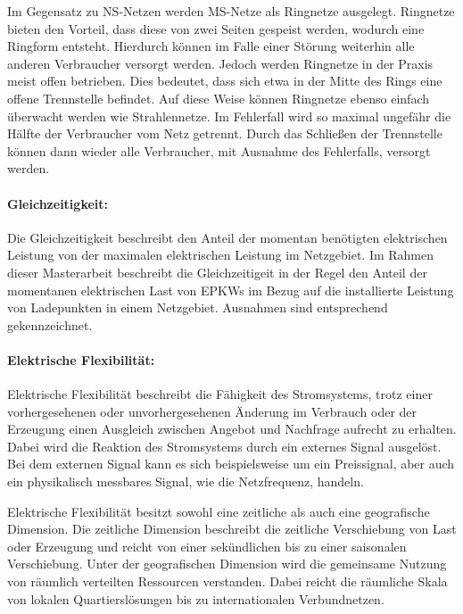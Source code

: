 Im Gegensatz zu \gls{NS}-Netzen werden \gls{MS}-Netze als Ringnetze ausgelegt.
Ringnetze bieten den Vorteil, dass diese von zwei Seiten gespeist werden, wodurch eine Ringform entsteht.
Hierdurch können im Falle einer Störung weiterhin alle anderen Verbraucher versorgt werden.
Jedoch werden Ringnetze in der Praxis meist offen betrieben.
Dies bedeutet, dass sich etwa in der Mitte des Rings eine offene Trennstelle befindet.
Auf diese Weise können Ringnetze ebenso einfach überwacht werden wie Strahlennetze.
Im Fehlerfall wird so maximal ungefähr die Hälfte der Verbraucher vom Netz getrennt.
Durch das Schließen der Trennstelle können dann wieder alle Verbraucher, mit Ausnahme des Fehlerfalls, versorgt werden. \cite{WNG2020} \cite{Westermann2019}


\paragraph{Gleichzeitigkeit:}

Die Gleichzeitigkeit beschreibt den Anteil der momentan benötigten elektrischen Leistung von der maximalen elektrischen Leistung im Netzgebiet. \cite{Agora2019} 
Im Rahmen dieser Masterarbeit beschreibt die Gleichzeitigeit in der Regel den Anteil der momentanen elektrischen Last von \glspl{EPKW} im Bezug auf die installierte Leistung von Ladepunkten in einem Netzgebiet.
Ausnahmen sind entsprechend gekennzeichnet.


\paragraph{Elektrische Flexibilität:}

Elektrische Flexibilität beschreibt die Fähigkeit des Stromsystems, trotz einer vorhergesehenen oder unvorhergesehenen Änderung im Verbrauch oder der Erzeugung einen Ausgleich zwischen Angebot und Nachfrage aufrecht zu erhalten.
Dabei wird die Reaktion des Stromsystems durch ein externes Signal ausgelöst.
Bei dem externen Signal kann es sich beispielsweise um ein Preissignal, aber auch ein physikalisch messbares Signal, wie die Netzfrequenz, handeln. \medskip

Elektrische Flexibilität besitzt sowohl eine zeitliche als auch eine geografische Dimension.
Die zeitliche Dimension beschreibt die zeitliche Verschiebung von Last oder Erzeugung und reicht von einer sekündlichen bis zu einer saisonalen Verschiebung.
Unter der geografischen Dimension wird die gemeinsame Nutzung von räumlich verteilten Ressourcen verstanden.
Dabei reicht die räumliche Skala von lokalen Quartierslösungen bis zu internationalen Verbundnetzen. \cite{BNetzA2017} \cite{IEA2014}


